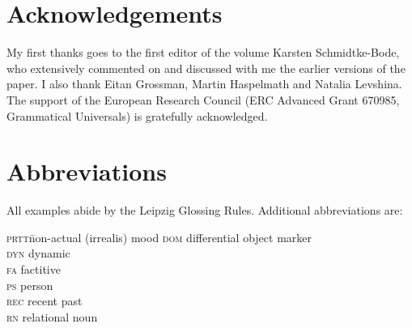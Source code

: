 \documentclass[output=paper]{langsci/langscibook}
\begin{document}
\newpage

\section*{Acknowledgements} 

My first thanks goes to the first editor of the volume Karsten Schmidtke-Bode, who extensively commented on and discussed with me the earlier versions of the paper. I also thank Eitan Grossman, Martin Haspelmath and Natalia Levshina. The support of the European Research Council (ERC Advanced Grant 670985, Grammatical Universals) is gratefully acknowledged.

\section*{Abbreviations} 

All examples abide by the Leipzig Glossing Rules. Additional abbreviations are: 

\begin{multicols}{2}
\begin{tabbing}
\textsc{prtt}\hspace{5mm}\=non-actual (irrealis) mood\hspace{5mm}\kill
\textsc{dom}  \>  differential object marker                 \\
\textsc{dyn} \> dynamic                          \\
\textsc{fa}   \>  factitive                  \\
\textsc{ps} \>  person \\
\textsc{rec} \>  recent past \\
\textsc{rn} \>  relational noun \\
\end{tabbing}
\end{multicols}

\sloppy
\printbibliography[heading=subbibliography,notkeyword=this] 
\end{document}
